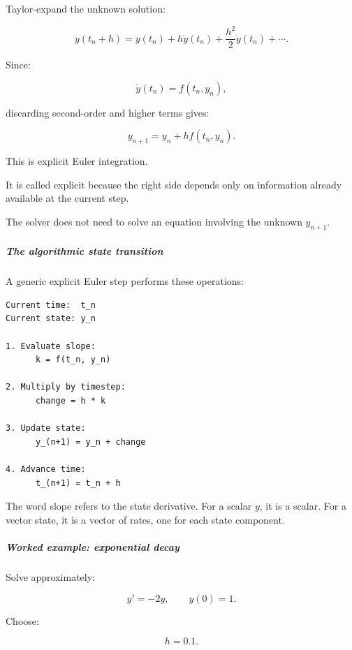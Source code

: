 Taylor-expand the unknown solution:

\[
y(t_n+h) = y(t_n) + h\dot y(t_n) + \frac{h^2}{2}\ddot y(t_n) +\cdots.
\]

Since:

\[
\dot y(t_n)=f(t_n,y_n),
\]

discarding second-order and higher terms gives:

\[
\boxed{ y_{n+1}=y_n+h f(t_n,y_n) }.
\]

This is explicit Euler integration.

It is called explicit because the right side depends only on information already available at the current step.

The solver does not need to solve an equation involving the unknown \(y_{n+1}\).

\subparagraph{The algorithmic state transition}\label{02-foundations-ii-ch025-the-algorithmic-state-transition}

\hypertarget{02-foundations-ii-ch025-the-algorithmic-state-transition}{}

A generic explicit Euler step performs these operations:

\begin{verbatim}
Current time:  t_n
Current state: y_n

1. Evaluate slope:
      k = f(t_n, y_n)

2. Multiply by timestep:
      change = h * k

3. Update state:
      y_(n+1) = y_n + change

4. Advance time:
      t_(n+1) = t_n + h
\end{verbatim}

The word slope refers to the state derivative. For a scalar \(y\), it is a scalar. For a vector state, it is a vector of rates, one for each state component.

\begin{allmightroleexample}

\subparagraph{Worked example: exponential decay}\label{02-foundations-ii-ch025-worked-example-exponential-decay}

\hypertarget{02-foundations-ii-ch025-worked-example-exponential-decay}{}

Solve approximately:

\end{allmightroleexample}

\[
y'=-2y,\qquad y(0)=1.
\]

Choose:

\[
h=0.1.
\]

